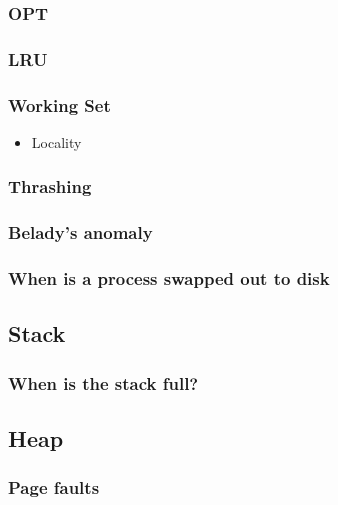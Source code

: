 \documentclass[11pt]{article}
\begin{document}
\subsubsection{OPT}
\label{sec-5.2.1}

\subsubsection{LRU}
\label{sec-5.2.2}

\subsubsection{Working Set}
\label{sec-5.2.3}

\begin{itemize}

\item Locality\\
\label{sec-5.2.3.1}

\end{itemize} %
\subsubsection{Thrashing}
\label{sec-5.2.4}

\subsubsection{Belady's anomaly}
\label{sec-5.2.5}

\subsubsection{When is a process swapped out to disk}
\label{sec-5.2.6}

\subsection{Stack}
\label{sec-5.3}

\subsubsection{When is the stack full?}
\label{sec-5.3.1}

\subsection{Heap}
\label{sec-5.4}

\subsubsection{Page faults}
\label{sec-5.4.1}
\end{document}
